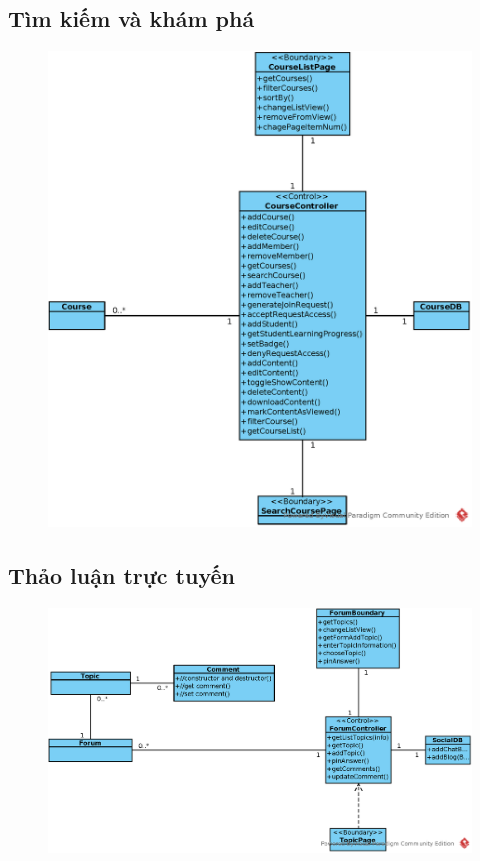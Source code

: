 \documentclass[./../main_file.tex]{subfiles}
\begin{document}
\subsection{Tìm kiếm và khám phá}
\begin{figure}[H]
	\centering
	\includegraphics[width=\linewidth]{./images/define_operations/ucd_method_search_course.eps}
\end{figure}
\subsection{Thảo luận trực tuyến}
\begin{figure}[H]
	\centering
	\includegraphics[width=\linewidth]{./images/define_operations/ucd_method_forum_discussion.eps}
\end{figure}
\end{document}

